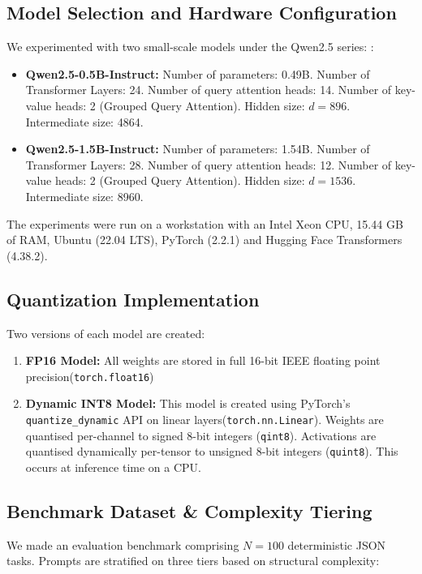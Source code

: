 \documentclass[10pt,journal,compsoc]{IEEEtran}
\begin{document}
\subsection{Model Selection and Hardware Configuration}
We experimented with two small-scale models under the Qwen2.5 series: \cite{qwen2024qwen25}:
\begin{itemize}
    \item \textbf{Qwen2.5-0.5B-Instruct:} Number of parameters: 0.49B. Number of Transformer Layers: 24. Number of query attention heads: 14. Number of key-value heads: 2 (Grouped Query Attention). Hidden size: $d=896$. Intermediate size: 4864.

    \item \textbf{Qwen2.5-1.5B-Instruct:} Number of parameters: 1.54B. Number of Transformer Layers: 28. Number of query attention heads: 12. Number of key-value heads: 2 (Grouped Query Attention). Hidden size: $d=1536$. Intermediate size: 8960.
\end{itemize}

The experiments were run on a workstation with an Intel Xeon CPU, 15.44 GB of RAM, Ubuntu (22.04 LTS), PyTorch (2.2.1) and Hugging Face Transformers (4.38.2).

\subsection{Quantization Implementation}
Two versions of each model are created:
\begin{enumerate}
\item \textbf{FP16 Model:} All weights are stored in full 16-bit IEEE floating point precision(\texttt{torch.float16})
\item \textbf{Dynamic INT8 Model:} This model is created using PyTorch's \texttt{quantize\_dynamic} API on linear layers(\texttt{torch.nn.Linear}). Weights are quantised per-channel to signed 8-bit integers (\texttt{qint8}). Activations are quantised dynamically per-tensor to unsigned 8-bit integers (\texttt{quint8}). This occurs at inference time on a CPU.
\end{enumerate}

\subsection{Benchmark Dataset \& Complexity Tiering}
We made an evaluation benchmark comprising $N=100$ deterministic JSON tasks. Prompts are stratified on three tiers based on structural complexity:
\end{document}
